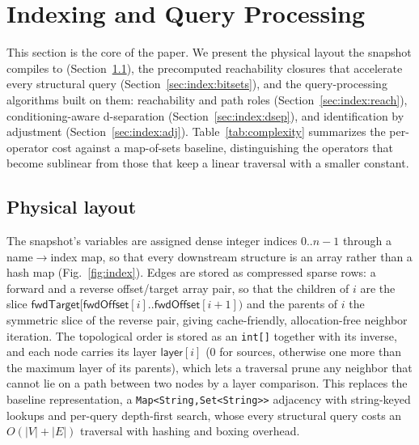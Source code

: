 \section{Indexing and Query Processing}\label{sec:index}

This section is the core of the paper. We present the physical layout the
snapshot compiles to (Section~\ref{sec:index:layout}), the precomputed
reachability closures that accelerate every structural query
(Section~\ref{sec:index:bitsets}), and the query-processing algorithms built
on them: reachability and path roles (Section~\ref{sec:index:reach}),
conditioning-aware d-separation (Section~\ref{sec:index:dsep}), and
identification by adjustment (Section~\ref{sec:index:adj}).
Table~\ref{tab:complexity} summarizes the per-operator cost against a
map-of-sets baseline, distinguishing the operators that become sublinear from
those that keep a linear traversal with a smaller constant.

\subsection{Physical layout}\label{sec:index:layout}

The snapshot's variables are assigned dense integer indices $0..n-1$ through a
\textsf{name}$\to$\textsf{index} map, so that every downstream structure is an
array rather than a hash map (Fig.~\ref{fig:index}). Edges are stored as
compressed sparse rows: a forward and a reverse offset/target array pair, so
that the children of $i$ are the slice
$\textsf{fwdTarget}[\textsf{fwdOffset}[i] .. \textsf{fwdOffset}[i{+}1])$ and
the parents of $i$ the symmetric slice of the reverse pair, giving
cache-friendly, allocation-free neighbor iteration. The topological order is
stored as an \texttt{int[]} together with its inverse, and each node carries
its layer $\textsf{layer}[i]$ (0 for sources, otherwise one more than the
maximum layer of its parents), which lets a traversal prune any neighbor that
cannot lie on a path between two nodes by a layer comparison. This replaces
the baseline representation, a \lstinline[style=causaldsl]|Map<String,Set<String>>|
adjacency with string-keyed lookups and per-query depth-first search, whose
every structural query costs an $O(|V|+|E|)$ traversal with hashing and
boxing overhead.

